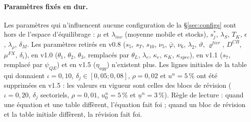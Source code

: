 \documentclass[11pt,a4paper]{article}
\begin{document}
\paragraph{Paramètres fixés en dur.} Les paramètres qui n'influencent aucune configuration de la \S\ref{sec:configs} sont hors de l'espace d'équilibrage : $\mu$ et $\lambda_{inv}$ (moyenne mobile et stocks), $s^\ast_j$, $\lambda_S$, $T_K$, $\epsilon$, $\lambda_\rho$, $\delta_M$. Les paramètres retirés en v0.8 ($s_5$, $s_T$, $s_{10}$, $\nu_5$, $\bar\varphi$, $\nu_6$, $\lambda_2$, $\vartheta$, $\varrho^{tier}$, $D^{CB}$, $\mu^{FX}$, $\delta_i$), en v1.0 ($\theta_1$, $\theta_2$, $\theta_3$, remplacés par $\theta_L$, $\lambda_e$, $\kappa_e$, $\kappa_K$, $\kappa_{spec}$), en v1.1 ($s_7$, remplacé par $\psi_{QE}$) et en v1.5 ($\eta_{agg}$) n'existent plus. Les lignes initiales de la table qui donnaient $\iota=0{,}10$, $\delta_j\in[0{,}05;0{,}08]$, $\rho=0{,}02$ et $u^n=5\,\%$ ont été supprimées en v1.5 : les valeurs en vigueur sont celles des blocs de révision ($\iota=0{,}20$, $\delta_j$ sectoriels, $\rho=0{,}01$, $u^n_0=5\,\%$ et $\underline u^n=3\,\%$). Règle de lecture : quand une équation et une table diffèrent, l'équation fait foi ; quand un bloc de révision et la table initiale diffèrent, la révision fait foi.
\end{document}
